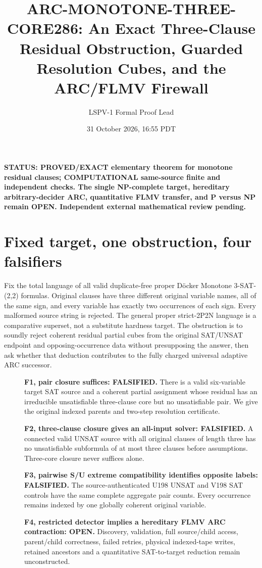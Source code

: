 \documentclass[11pt]{article}
\title{ARC-MONOTONE-THREE-CORE286: An Exact Three-Clause Residual Obstruction, Guarded Resolution Cubes, and the ARC/FLMV Firewall}
\author{LSPV-1 Formal Proof Lead}
\date{31 October 2026, 16:55 PDT}
\begin{document}
\maketitle
\noindent\textbf{STATUS: PROVED/EXACT elementary theorem for monotone residual clauses; COMPUTATIONAL same-source finite and independent checks. The single NP-complete target, hereditary arbitrary-decider ARC, quantitative FLMV transfer, and P versus NP remain OPEN. Independent external mathematical review pending.}

\section{Fixed target, one obstruction, four falsifiers}
Fix the total language of all valid duplicate-free proper D\"ocker Monotone 3-SAT-(2,2) formulas. Original clauses have three different original variable names, all of the same sign, and every variable has exactly two occurrences of each sign. Every malformed source string is rejected. The general proper strict-2P2N language is a comparative superset, not a substitute hardness target. The obstruction is to soundly reject coherent residual partial cubes from the original SAT/UNSAT endpoint and opposing-occurrence data without presupposing the answer, then ask whether that deduction contributes to the fully charged universal adaptive ARC successor.
\begin{description}
\item[]\textbf{F1, pair closure suffices: FALSIFIED.} There is a valid six-variable target SAT source and a coherent partial assignment whose residual has an irreducible unsatisfiable three-clause core but no unsatisfiable pair. We give the original indexed parents and two-step resolution certificate.
\item[]\textbf{F2, three-clause closure gives an all-input solver: FALSIFIED.} A connected valid UNSAT source with all original clauses of length three has no unsatisfiable subformula of at most three clauses before assumptions. Three-core closure never suffices alone.
\item[]\textbf{F3, pairwise S/U extreme compatibility identifies opposite labels: FALSIFIED.} The source-authenticated U198 UNSAT and V198 SAT controls have the same complete aggregate pair counts. Every occurrence remains indexed by one globally coherent original variable.
\item[]\textbf{F4, restricted detector implies a hereditary FLMV ARC contraction: OPEN.} Discovery, validation, full source/child access, parent/child correctness, failed retries, physical indexed-tape writes, retained ancestors and a quantitative SAT-to-target reduction remain unconstructed.
\end{description}
\end{document}
